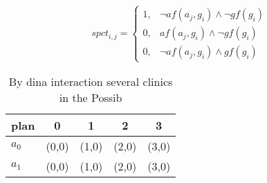 \documentclass[a4paper]{article}
\begin{document}
\begin{equation}
spct_{i,j} =
\begin{cases}
1, & \text{$\neg af(a_j,g_i) \wedge \neg gf(g_i)$}\\
0, & \text{$af(a_j,g_i) \wedge \neg gf(g_i)$}\\
0, & \text{$\neg af(a_j,g_i) \wedge gf(g_i)$}
\end{cases}
\end{equation}

\begin{table}
\begin{adjustbox}{width=0.8\columnwidth}
\begin{tabular}{|l|l|l|l|l|}
\hline
\textbf{plan} & \multicolumn{1}{c|}{\textbf{0}} & \multicolumn{1}{c|}{\textbf{1}} & \multicolumn{1}{c|}{\textbf{2}} & \multicolumn{1}{c|}{\textbf{3}} \\ \hline
\textbf{$a_0$}  & (0,0) & (1,0) & (2,0) & (3,0) \\ \hline
\textbf{$a_1$}  & (0,0) & (1,0) & (2,0) & (3,0) \\ \hline
\end{tabular}
\end{adjustbox}
\caption{By dina interaction several clinics in the Possib
}
\end{table}
\end{document}
